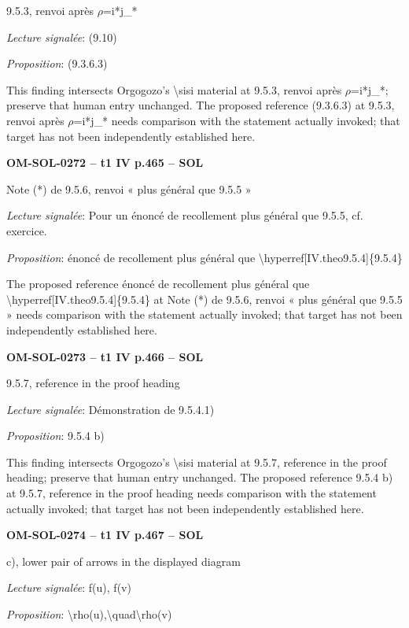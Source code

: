 9.5.3, renvoi après \ensuremath{\rho}=\allowbreak i*j\_*\par
\emph{Lecture signalée}: (9.10)\par
\emph{Proposition}: (9.3.6.3)\par
This finding intersects Orgogozo's \textbackslash{}sisi material at 9.5.3, renvoi après \ensuremath{\rho}=\allowbreak i*j\_*; preserve that human entry unchanged. The proposed reference (9.3.6.3) at 9.5.3, renvoi après \ensuremath{\rho}=\allowbreak i*j\_* needs comparison with the statement actually invoked; that target has not been independently established here.\par
\par\noindent\textbf{OM-SOL-0272 -- t1 IV p.465 -- SOL}\par
Note (*) de 9.5.6, renvoi « plus général que 9.5.5 »\par
\emph{Lecture signalée}: Pour un énoncé de recollement plus général que 9.5.5, cf. exercice.\par
\emph{Proposition}: énoncé de recollement plus général que \textbackslash{}hyperref[IV.theo9.5.4]\{9.5.4\}\par
The proposed reference énoncé de recollement plus général que \textbackslash{}hyperref[IV.theo9.5.4]\{9.5.4\} at Note (*) de 9.5.6, renvoi « plus général que 9.5.5 » needs comparison with the statement actually invoked; that target has not been independently established here.\par
\par\noindent\textbf{OM-SOL-0273 -- t1 IV p.466 -- SOL}\par
9.5.7, reference in the proof heading\par
\emph{Lecture signalée}: Démonstration de 9.5.4.1)\par
\emph{Proposition}: 9.5.4 b)\par
This finding intersects Orgogozo's \textbackslash{}sisi material at 9.5.7, reference in the proof heading; preserve that human entry unchanged. The proposed reference 9.5.4 b) at 9.5.7, reference in the proof heading needs comparison with the statement actually invoked; that target has not been independently established here.\par
\par\noindent\textbf{OM-SOL-0274 -- t1 IV p.467 -- SOL}\par
c), lower pair of arrows in the displayed diagram\par
\emph{Lecture signalée}: f(u), f(v)\par
\emph{Proposition}: \textbackslash{}rho(u),\textbackslash{}quad\textbackslash{}rho(v)\par
